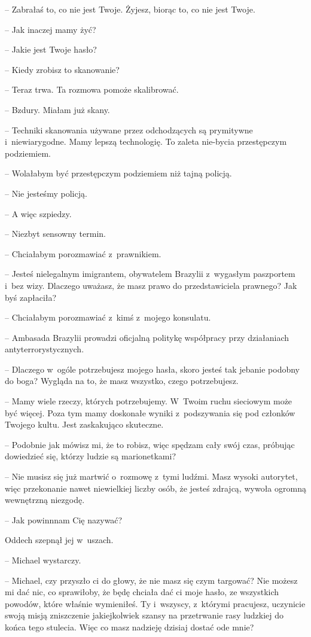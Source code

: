 \documentclass[oneside,polish,11pt,sfheadings]{mwbk}
\begin{document}
-- Zabrałaś to, co nie jest Twoje. Żyjesz, biorąc to, co nie jest Twoje.

-- Jak inaczej mamy żyć?

-- Jakie jest Twoje hasło?

-- Kiedy zrobisz to skanowanie?

-- Teraz trwa. Ta rozmowa pomoże skalibrować.

-- Bzdury. Miałam już skany.

-- Techniki skanowania używane przez odchodzących są prymitywne i~niewiarygodne. Mamy lepszą technologię. To zaleta nie-bycia przestępczym
podziemiem.

-- Wolałabym być przestępczym podziemiem niż tajną policją.

-- Nie jesteśmy policją.

-- A więc szpiedzy.

-- Niezbyt sensowny termin.

-- Chciałabym porozmawiać z~prawnikiem.

-- Jesteś nielegalnym imigrantem, obywatelem Brazylii z~wygasłym
paszportem i~bez wizy. Dlaczego uważasz, że masz prawo do
przedstawiciela prawnego? Jak byś zapłaciła?

-- Chciałabym porozmawiać z~kimś z~mojego konsulatu.

-- Ambasada Brazylii prowadzi oficjalną politykę współpracy przy
działaniach antyterrorystycznych.

-- Dlaczego w~ogóle potrzebujesz mojego hasła, skoro jesteś tak jebanie
podobny do boga? Wygląda na to, że masz wszystko, czego potrzebujesz.

-- Mamy wiele rzeczy, których potrzebujemy. W~Twoim ruchu sieciowym może
być więcej. Poza tym mamy doskonałe wyniki z~podszywania się pod
członków Twojego kultu. Jest zaskakująco skuteczne.

-- Podobnie jak mówisz mi, że to robisz, więc spędzam cały swój czas,
próbując dowiedzieć się, którzy ludzie są marionetkami?

-- Nie musisz się już martwić o~rozmowę z~tymi ludźmi. Masz wysoki
autorytet, więc przekonanie nawet niewielkiej liczby osób, że jesteś
zdrajcą, wywoła ogromną wewnętrzną niezgodę.

-- Jak powinnnam Cię nazywać?

Oddech szepnął jej w~uszach. 

-- Michael wystarczy.

-- Michael, czy przyszło ci do głowy, że nie masz się czym targować? Nie
możesz mi dać nic, co sprawiłoby, że będę chciała dać ci moje hasło, ze
wszystkich powodów, które właśnie wymieniłeś. Ty i~wszyscy, z~którymi
pracujesz, uczynicie swoją misją zniszczenie jakiejkolwiek szansy na
przetrwanie rasy ludzkiej do końca tego stulecia. Więc co masz nadzieję
dzisiaj dostać ode mnie?
\end{document}
